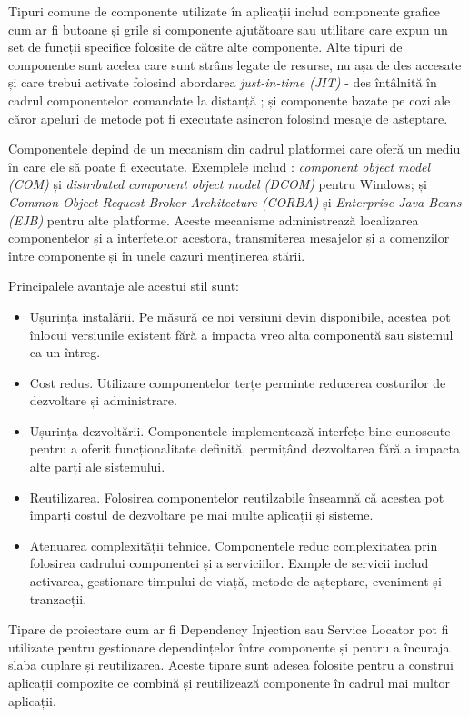 \documentclass[12pt, a4paper, oneside, romanian]{teza-upb}
\begin{document}
Tipuri comune de componente utilizate în aplicații includ componente grafice cum ar fi butoane și grile și componente ajutătoare sau utilitare care expun un set de funcții specifice folosite de către alte componente. Alte tipuri de componente sunt acelea care sunt strâns legate de resurse, nu așa de des accesate și care trebui activate folosind abordarea \emph{just-in-time (JIT)} - des întâlnită în cadrul componentelor comandate la distanță ; și componente bazate pe cozi ale căror apeluri de metode pot fi executate asincron folosind mesaje de asteptare.

Componentele depind de un mecanism din cadrul platformei care oferă un mediu în care ele să poate fi executate. Exemplele includ : \emph{component object model (COM)} și \emph{ distributed component object model (DCOM)} pentru Windows; și \emph{Common Object Request Broker Architecture (CORBA)} și \emph{Enterprise Java 	Beans (EJB)} pentru alte platforme. Aceste mecanisme administrează localizarea componentelor și a interfețelor acestora, transmiterea mesajelor și a comenzilor între componente și în unele cazuri menținerea stării.

Principalele avantaje ale acestui stil sunt:
\begin{itemize}
 \item Ușurința instalării. Pe măsură ce noi versiuni devin disponibile, acestea pot înlocui versiunile existent fără a impacta vreo alta componentă sau sistemul ca un întreg.
 \item Cost redus. Utilizare componentelor terțe perminte reducerea costurilor de dezvoltare și administrare.
 \item Ușurința dezvoltării. Componentele implementează interfețe bine cunoscute pentru a oferit funcționalitate definită, permițând dezvoltarea fără a impacta alte parți ale sistemului.
 \item Reutilizarea. Folosirea componentelor reutilzabile înseamnă că acestea pot împarți costul de dezvoltare pe mai multe aplicații și sisteme.
 \item Atenuarea complexității tehnice. Componentele reduc complexitatea prin folosirea cadrului componentei și a serviciilor. Exmple de servicii includ activarea, gestionare timpului de viață, metode de așteptare, eveniment și tranzacții.
\end{itemize}

Tipare de proiectare cum ar fi Dependency Injection sau Service Locator pot fi utilizate pentru gestionare dependințelor între componente și pentru a încuraja slaba cuplare și reutilizarea. Aceste tipare sunt adesea folosite pentru a construi aplicații compozite ce combină și reutilizează componente în cadrul mai multor aplicații.
\end{document}
